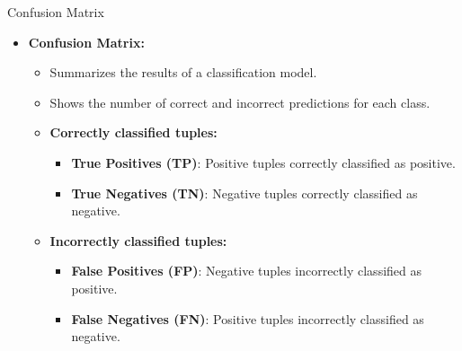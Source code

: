 \begin{frame}{Confusion Matrix}
	\begin{itemize}
		\item \textbf{Confusion Matrix:}
		      \begin{itemize}
			      \item Summarizes the results of a classification model.
			      \item Shows the number of correct and incorrect predictions for each class.
			      \item \textbf{\color{airforceblue}Correctly classified tuples:}
			            \begin{itemize}
				            \item \textbf{True Positives (TP)}: Positive tuples correctly classified as positive.
				            \item \textbf{True Negatives (TN)}: Negative tuples correctly classified as negative.
			            \end{itemize}
			      \item \textbf{\color{airforceblue}Incorrectly classified tuples:}
			            \begin{itemize}
				            \item \textbf{False Positives (FP)}: Negative tuples incorrectly classified as positive.
				            \item \textbf{False Negatives (FN)}: Positive tuples incorrectly classified as negative.
			            \end{itemize}
		      \end{itemize}
	\end{itemize}
\end{frame}

